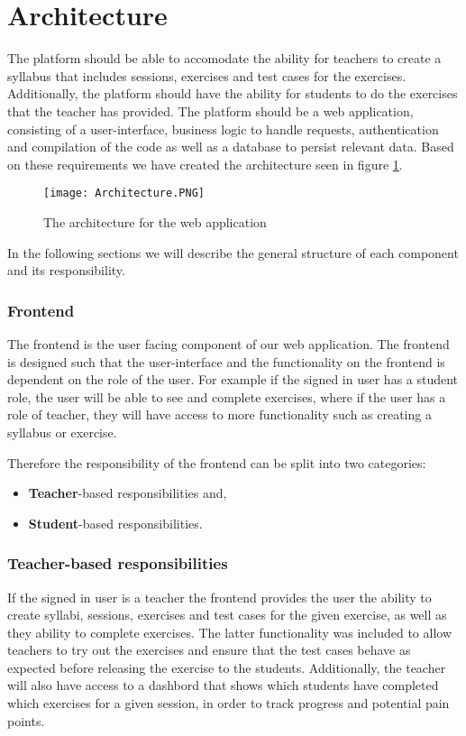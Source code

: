 \section{Architecture}
The platform should be able to accomodate the ability for teachers to create a syllabus that includes sessions, exercises and test cases for the exercises. Additionally, the platform should have the ability for students to do the exercises that the teacher has provided. 
The platform should be a web application, consisting of a user-interface, business logic to handle requests, authentication and compilation of the code as well as a database to persist relevant data.
Based on these requirements we have created the architecture seen in figure \ref{fig:Architecture}.

\begin{figure}[H]
	\texttt{[image: Architecture.PNG]}
	\centering
	\caption{The architecture for the web application}
	\label{fig:Architecture}
\end{figure}

In the following sections we will describe the general structure of each component and its responsibility.

\subsubsection{Frontend}
The frontend is the user facing component of our web application. The frontend is designed such that the user-interface and the functionality on the frontend is dependent on the role of the user. 
For example if the signed in user has a student role, the user will be able to see and complete exercises, where if the user has a role of teacher, they will have access to more functionality such as creating a syllabus or exercise.

Therefore the responsibility of the frontend can be split into two categories: 
\begin{itemize}
    \item \textbf{Teacher}-based responsibilities and,
    \item \textbf{Student}-based responsibilities.
\end{itemize}

\subsubsection*{Teacher-based responsibilities}
If the signed in user is a teacher the frontend provides the user the ability to create syllabi, sessions, exercises and test cases for the given exercise, as well as they ability to complete exercises. The latter functionality was included to allow teachers to try out the exercises and ensure that the test cases behave as expected before releasing the exercise to the students. Additionally, the teacher will also have access to a dashbord that shows which students have completed which exercises for a given session, in order to track progress and potential pain points.

